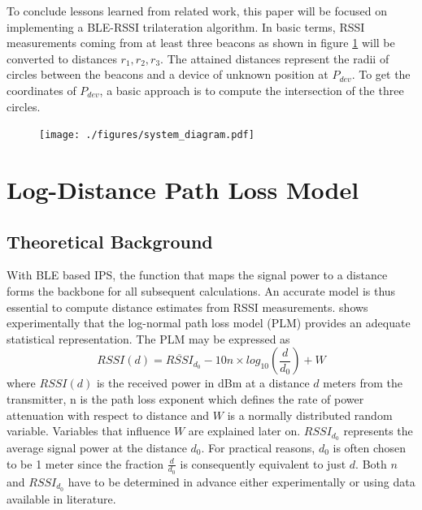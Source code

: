 \documentclass[a4paper, oneside]{ipsreport}
\begin{document}
To conclude lessons learned from related work, this paper will be focused on implementing a BLE-RSSI trilateration algorithm. In basic terms, RSSI measurements coming from at least three beacons as shown in figure \ref{fig:basic_outline} will be converted to distances $r_1, r_2, r_3$. The attained distances represent the radii of circles between the beacons and a device of unknown position at $P_{dev}$. To get the coordinates of $P_{dev}$, a basic approach is to compute the intersection of the three circles.

\begin{figure}[h]
	\centering
	\texttt{[image: ./figures/system\_diagram.pdf]}
	\label{fig:basic_outline}
\end{figure}

\section{Log-Distance Path Loss Model}
\label{section:pathLossModel}
\subsection{Theoretical Background}
\label{subsection:theoreticalBackground}
With BLE based IPS, the function that maps the signal power to a distance forms the backbone for all subsequent calculations. An accurate model is thus essential to compute distance estimates from RSSI measurements. \autocite{AntennaDiversity} shows experimentally that the log-normal path loss model (PLM) provides an adequate statistical representation. The PLM may be expressed as
\begin{equation} \label{eq:1}
	RSSI(d) = \overline{RSSI}_{d_0} - 10n \times log_{10} (\frac{d}{d_0}) + W
\end{equation}
where $RSSI(d)$ is the received power in dBm at a distance $d$ meters from the transmitter, n is the path loss exponent which defines the rate of power attenuation with respect to distance and $W$ is a normally distributed random variable. Variables that influence $W$ are explained later on. $RSSI_{d_0}$ represents the average signal power at the distance $d_0$. For practical reasons, $d_0$ is often chosen to be 1 meter since the fraction $\frac{d}{d_0}$ is consequently equivalent to just $d$. Both $n$ and $RSSI_{d_0}$ have to be determined in advance either experimentally or using data available in literature.
\end{document}
